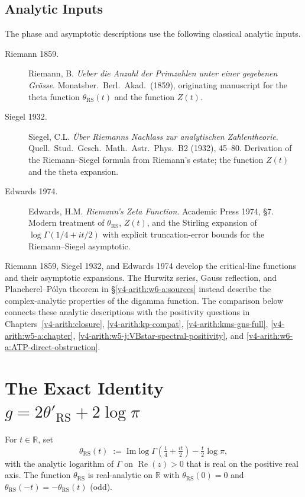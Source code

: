 \subsection{Analytic Inputs}
\label{v4-arith:w7-a:sources}

The phase and asymptotic descriptions use the following classical analytic inputs.

\begin{description}
\item[Riemann 1859.] Riemann, B. \emph{Ueber die Anzahl der Primzahlen
unter einer gegebenen Gr\"osse}. Monatsber.~Berl.~Akad.~(1859),
originating manuscript for the theta function
\(\theta_{\mathrm{RS}}(t)\) and the function \(Z(t)\).
\item[Siegel 1932.] Siegel, C.L. \emph{\"Uber Riemanns Nachlass zur
analytischen Zahlentheorie}. Quell.~Stud.~Gesch.~Math.~Astr.~Phys.~B2
(1932), 45--80. Derivation of the Riemann--Siegel formula from
Riemann's estate; the function \(Z(t)\) and the theta expansion.
\item[Edwards 1974.] Edwards, H.M. \emph{Riemann's Zeta Function}.
Academic Press 1974, \S7. Modern treatment of \(\theta_{\mathrm{RS}}\),
\(Z(t)\), and the Stirling expansion of \(\log\Gamma(1/4+it/2)\) with
explicit truncation-error bounds for the Riemann--Siegel asymptotic.
\end{description}

Riemann 1859, Siegel 1932, and Edwards 1974 develop the
critical-line functions and their asymptotic expansions. The Hurwitz
series, Gauss reflection, and Plancherel--P\'olya theorem in
\S\ref{v4-arith:w6-a:sources} instead describe the complex-analytic
properties of the digamma function. The comparison below connects
these analytic descriptions with the positivity questions in
Chapters~\ref{v4-arith:closure}, \ref{v4-arith:kp-compat},
\ref{v4-arith:kms-gns-full}, \ref{v4-arith:w5-a:chapter},
\ref{v4-arith:w5-j:VBstar-spectral-positivity}, and
\ref{v4-arith:w6-a:ATP-direct-obstruction}.

\section{The Exact Identity \(g=2\theta'_{\mathrm{RS}}+2\log\pi\)}
\label{v4-arith:w7-a:identity}

\begin{definition}
\label{v4-arith:w7-a:def:theta-RS}
For \(t\in\mathbb{R}\), set
\begin{equation}
\label{v4-arith:w7-a:eq:theta-RS-def}
\theta_{\mathrm{RS}}(t)\;:=\;\mathrm{Im}\log\Gamma\!\left(\tfrac{1}{4}+\tfrac{it}{2}\right)-\tfrac{t}{2}\log\pi,
\end{equation}
with the analytic logarithm of \(\Gamma\) on
\(\operatorname{Re}(z)>0\) that is real on the positive real axis. The function \(\theta_{\mathrm{RS}}\) is
real-analytic on \(\mathbb{R}\) with \(\theta_{\mathrm{RS}}(0)=0\) and
\(\theta_{\mathrm{RS}}(-t)=-\theta_{\mathrm{RS}}(t)\) (odd).
\end{definition}


